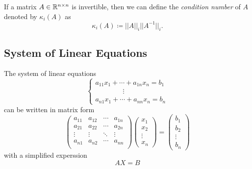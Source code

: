 \begin{definition}
If a matrix \(A\in\mathbb{R}^{n\times n}\) is invertible, then we can define the \emph{condition number} of $A$ denoted by \(\kappa_i(A)\) as
\begin{equation}
\kappa_i(A)\coloneqq||A||_i||A^{-1}||_i.
\end{equation}
\end{definition}


\subsection{System of Linear Equations}
The system of linear equations
\begin{equation}
\begin{cases}
a_{11}x_1+\cdots+a_{1n}x_n=b_1\\
\qquad\qquad\vdots \\
a_{n1}x_1+\cdots+a_{nn}x_n=b_n
\end{cases}
\end{equation}
can be written in matrix form
\begin{equation}
\begin{pmatrix}
a_{11} & a_{12} & \cdots & a_{1n} \\
a_{21} & a_{22} & \cdots & a_{2n} \\
\vdots & \vdots & \ddots & \vdots \\
a_{n1} & a_{n2} & \cdots & a_{nn} \\
\end{pmatrix}
\begin{pmatrix}
x_1 \\ x_2 \\ \vdots \\ x_n
\end{pmatrix}
=
\begin{pmatrix}
b_1 \\ b_2 \\ \vdots \\ b_n
\end{pmatrix}
\end{equation}
with a simplified experssion
\[ AX=B \]

